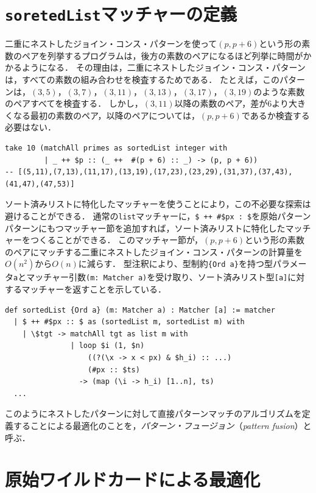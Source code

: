 \section{\texttt{soretedList}マッチャーの定義}\label{matcher-sorted}

二重にネストしたジョイン・コンス・パターンを使って$(p,p+6)$という形の素数のペアを列挙するプログラムは，後方の素数のペアになるほど列挙に時間がかかるようになる．
その理由は，二重にネストしたジョイン・コンス・パターンは，すべての素数の組み合わせを検査するためである．
たとえば，このパターンは，$(3,5)$，$(3,7)$，$(3,11)$，$(3,13)$，$(3, 17)$，$(3,19)$のような素数のペアすべてを検査する．
しかし，$(3,11)$以降の素数のペア，差が$6$より大きくなる最初の素数のペア，以降のペアについては，$(p,p+6)$であるか検査する必要はない．
\begin{lstlisting}[language=egison,numbers=none]
take 10 (matchAll primes as sortedList integer with
         | _ ++ $p :: (_ ++  #(p + 6) :: _) -> (p, p + 6))
-- [(5,11),(7,13),(11,17),(13,19),(17,23),(23,29),(31,37),(37,43),(41,47),(47,53)]
\end{lstlisting}

ソート済みリストに特化したマッチャーを使うことにより，この不必要な探索は避けることができる．
通常の\lstinline{list}マッチャーに，\lstinline|$ ++ #$px : $|を原始パターンパターンにもつマッチャー節を追加すれば，ソート済みリストに特化したマッチャーをつくることができる．
このマッチャー節が，$(p,p+6)$という形の素数のペアにマッチする二重にネストしたジョイン・コンス・パターンの計算量を$O(n^2)$から$O(n)$に減らす．
型注釈により、型制約\lstinline|{Ord a}|を持つ型パラメータ\lstinline{a}とマッチャー引数\lstinline|(m: Matcher a)|を受け取り、ソート済みリスト型\lstinline|[a]|に対するマッチャーを返すことを示している．
\begin{lstlisting}[language=egison,numbers=none]
def sortedList {Ord a} (m: Matcher a) : Matcher [a] := matcher
  | $ ++ #$px :: $ as (sortedList m, sortedList m) with
    | \$tgt -> matchAll tgt as list m with
               | loop $i (1, $n)
                   ((?(\x -> x < px) & $h_i) :: ...)
                   (#px :: $ts)
                 -> (map (\i -> h_i) [1..n], ts)
  ...
\end{lstlisting}
このようにネストしたパターンに対して直接パターンマッチのアルゴリズムを定義することによる最適化のことを，\emph{パターン・フュージョン}（\emph{pattern fusion}）と呼ぶ．

\section{原始ワイルドカードによる最適化}\label{matcher-wildcard}


